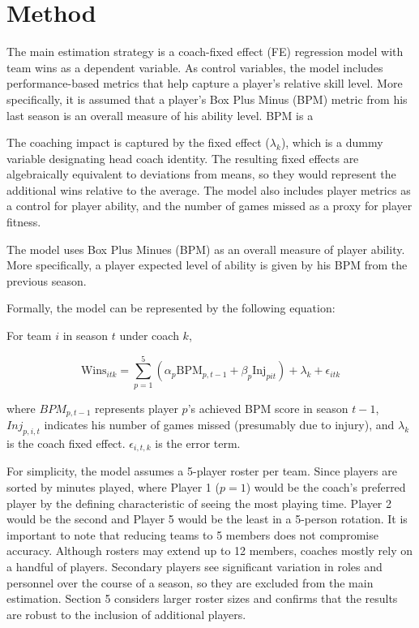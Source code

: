 
\section{Method}

The main estimation strategy is a coach-fixed effect (FE) regression model with team wins as a dependent variable. As control variables, the model includes performance-based metrics that help capture a player's relative skill level. More specifically, it is assumed that a player's Box Plus Minus (BPM) metric from his last season is an overall measure of his ability level. BPM is a 

The coaching impact is captured by the fixed effect ($\lambda_{k}$), which is a dummy variable designating head coach identity. The resulting fixed effects are algebraically equivalent to deviations from means, so they would represent the additional wins relative to the average. The model also includes player metrics as a control for player ability, and the number of games missed as a proxy for player fitness. 

The model uses Box Plus Minues (BPM) as an overall measure of player ability. More specifically, a player expected level of ability is given by his BPM from the previous season. 

Formally, the model can be represented by the following equation: 

For team $i$ in season $t$ under coach $k$,

\begin{equation}
\text{Wins}_{itk} = \sum_{p=1}^{5}(\alpha_{p}\text{BPM}_{p,t-1} + \beta_{p}\text{Inj}_{pit}) + \lambda_{k} + \epsilon_{itk}
\end{equation}

where ${BPM}_{p,t-1}$ represents player $p$'s achieved BPM score in season $t-1$, ${Inj}_{p,i,t}$ indicates his number of games missed (presumably due to injury), and $\lambda_{k}$ is the coach fixed effect. $\epsilon_{i,t,k}$ is the error term. 

For simplicity, the model assumes a 5-player roster per team. Since players are sorted by minutes played, where Player 1 ($p = 1$) would be the coach's preferred player by the defining characteristic of seeing the most playing time. Player 2 would be the second and Player 5 would be the least in a 5-person rotation. It is important to note that reducing teams to 5 members does not compromise accuracy. Although rosters may extend up to 12 members, coaches mostly rely on a handful of players. Secondary players see significant variation in roles and personnel over the course of a season, so they are excluded from the main estimation. Section 5 considers larger roster sizes and confirms that the results are robust to the inclusion of additional players.

